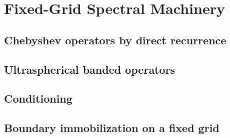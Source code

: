 
\section{Fixed-Grid Spectral Machinery}
\label{apx:spectral}

\subsection{Chebyshev operators by direct recurrence}
\label{sub:apx_chebyshev_operators}

\subsection{Ultraspherical banded operators}
\label{sub:apx_ultraspherical_operators}

\subsection{Conditioning}
\label{sub:apx_spectral_conditioning}

\subsection{Boundary immobilization on a fixed grid}
\label{sub:apx_immobilisation}
